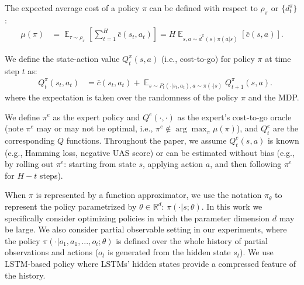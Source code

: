 \documentclass{article}
\begin{document}
The expected average cost of a policy $\pi$ can be defined with respect to $\rho_{\pi}$ or $\{d_t^{\pi}\}$:
\begin{align}
\mu(\pi) &= \mathop{\mathbb{E}}_{\tau\sim \rho_{\pi}}[\sum_{t=1}^H \bar{c}(s_t,a_t)]  = H\mathop{\mathbb{E}}_{s,a\sim \bar{d}^{\pi}(s)\pi(a|s)}[\bar{c}(s,a)].\nonumber
\end{align}


We define the state-action value $Q_t^{\pi}(s,a)$ (i.e., cost-to-go) for policy $\pi$ at time step $t$ as:
\begin{align}
&Q_t^{\pi}(s_t,a_t) %
&=\bar{c}(s_t,a_t) + \mathop{\mathbb{E}}_{s\sim P_t(\cdot|s_t,a_t),a\sim\pi(\cdot|s)}Q^\pi_{t+1}(s,a). \nonumber
\end{align} where the expectation is taken over the randomness of the policy $\pi$ and the MDP. 

We define $\pi^{e}$ as the expert policy and $Q^e(\cdot,\cdot)$ as the expert's cost-to-go oracle (note $\pi^e$ may or may not be optimal, i.e., $\pi^e \not\in \arg\max_{\pi} \mu(\pi)$), and $Q_t^{e}$ are the corresponding $Q$ functions. Throughout the paper, we assume $Q_t^{e}(s,a)$ is known (e.g., Hamming loss, negative UAS score) or can be estimated without bias (e.g., by rolling out $\pi^e$: starting from state $s$, applying action $a$, and then following $\pi^e$ for $H-t$ steps). %

When $\pi$ is represented by a function approximator, we use the notation $\pi_{\theta}$ to represent the policy parametrized by $\theta\in \mathbb{R}^{d}$: $\pi(\cdot|s;\theta)$. In this work we specifically consider optimizing policies in which the parameter dimension $d$ may be large.  We also consider partial observable setting in our experiments, where the policy $\pi(\cdot|o_1,a_1,...,o_t;\theta)$ is defined over the whole history of partial observations and actions ($o_t$ is generated from the hidden state $s_t$). We use LSTM-based policy \cite{duan2016benchmarking} where LSTMs' hidden states provide a compressed feature of the history.
\end{document}

